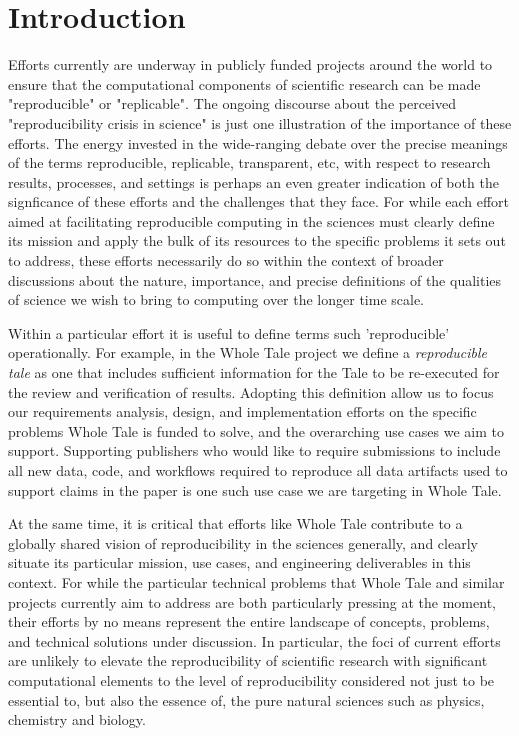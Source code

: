 
\section{Introduction}

Efforts currently are underway in publicly funded projects around the world to 
	ensure that the computational components of scientific research
	can be made "reproducible" or "replicable".
The ongoing discourse about the perceived "reproducibility crisis in science"
	is just one illustration of the importance of these efforts.
The energy invested in the wide-ranging debate over the precise meanings of the 
	terms reproducible, replicable, transparent, etc, with respect to research
	results, processes, and settings is perhaps an even greater indication of 
	both the signficance of these efforts and the challenges that they face.
For while each effort aimed at facilitating reproducible computing in the
	sciences must clearly define its mission and apply the bulk of its resources
	to the specific problems it sets out to address, these efforts necessarily do
	so within the context of broader discussions about the nature, importance,
	and precise definitions of the qualities of science we wish to bring to computing
	over the longer time scale.

Within a particular effort it is useful to define terms such 'reproducible' operationally.
For example, in the Whole Tale project we define a \emph{reproducible tale} as one 
	that includes sufficient information for the Tale to be re-executed for the review 
	and verification of results.
Adopting this definition allow us to focus our requirements analysis, design,
	and implementation efforts on the specific problems Whole Tale is funded to solve,
	and the overarching use cases we aim to support.
Supporting publishers who would like to require submissions to include all new data, 
	code, and workflows required to reproduce all data artifacts used to support
	claims in the paper is one such use case we are targeting in Whole Tale.

At the same time, it is critical that efforts like Whole Tale contribute to a globally 
	shared vision of reproducibility in the sciences generally, and clearly situate 
	its particular mission, use cases, and engineering deliverables in this context.
For while the particular technical problems that Whole Tale and similar projects currently
	aim to address are both particularly pressing at the moment, their efforts by no means
	represent the entire landscape of concepts, problems, and technical solutions
	under discussion.
In particular, the foci of current efforts are unlikely to elevate the reproducibility
	of scientific research with significant computational elements to the
	level of reproducibility considered not just to be essential to, but also the essence of,
	the pure natural sciences such as physics, chemistry and biology.

